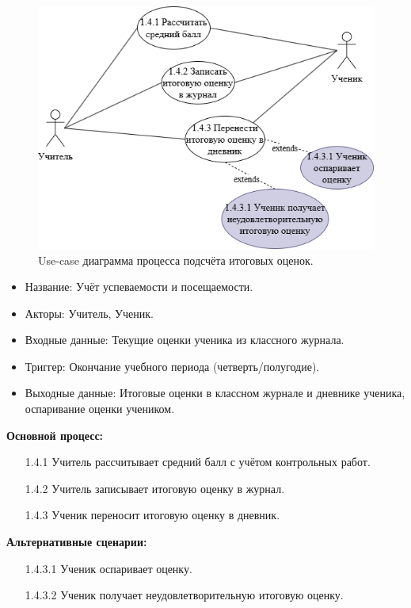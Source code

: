 \documentclass[a4paper, final]{article}
\begin{document}
\begin{figure}[H]
  \centering
  \includegraphics[width=\linewidth]{use_case24.png}
  \caption{Use-case диаграмма процесса подсчёта итоговых оценок.}
  \label{img:use_case24}
\end{figure}

\begin{itemize}
  \item Название: Учёт успеваемости и посещаемости.
  \item Акторы: Учитель, Ученик.
  \item Входные данные: Текущие оценки ученика из классного журнала.
  \item Триггер: Окончание учебного периода (четверть/полугодие).
  \item Выходные данные: Итоговые оценки в классном журнале и дневнике ученика, оспаривание оценки учеником.
\end{itemize}

\textbf{Основной процесс:}
\begin{enumerate}
  \item[1.4.1] Учитель рассчитывает средний балл с учётом контрольных работ.
  \item[1.4.2] Учитель записывает итоговую оценку в журнал.
  \item[1.4.3] Ученик переносит итоговую оценку в дневник.
\end{enumerate}

\textbf{Альтернативные сценарии:}
\begin{itemize}
  \item[1.4.3.1] Ученик оспаривает оценку.
  \item[1.4.3.2] Ученик получает неудовлетворительную итоговую оценку. 
\end{itemize}
\end{document}
